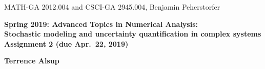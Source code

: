 \documentclass[12pt]{article}
\begin{document}
\begin{center}
  \vspace*{-2cm}
{\small MATH-GA 2012.004 and CSCI-GA 2945.004, Benjamin Peherstorfer}
\end{center}
\vspace*{.5cm}
\begin{center}
\large \textbf{%
Spring 2019: Advanced Topics in Numerical Analysis: \\
Stochastic modeling and uncertainty quantification in complex systems \\
Assignment 2 (due Apr.\ 22, 2019) }
\end{center}

\vspace*{0.4cm}
\begin{center}
\large \textbf{Terrence Alsup}
\end{center}

\vspace*{0.25cm}


\vspace*{0.25cm}
\end{document}
